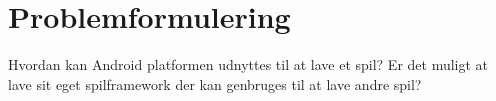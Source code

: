 \section{Problemformulering}
Hvordan kan Android platformen udnyttes til at lave et spil? Er det muligt at lave sit eget spilframework der kan genbruges til at lave andre spil?